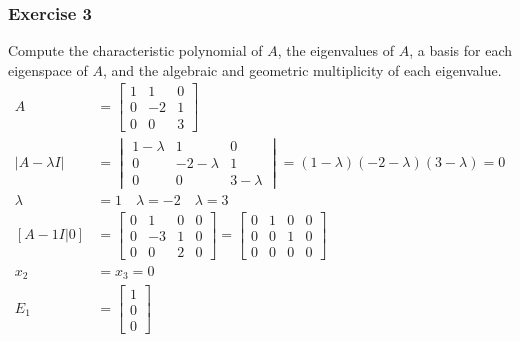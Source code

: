 \documentclass{math}
\begin{document}
\subsubsection*{Exercise 3}
Compute the characteristic polynomial of \( A \), the eigenvalues of \( A \),
a basis for each eigenspace of \( A \), and the algebraic and geometric
multiplicity of each eigenvalue.
\begin{align*}
  A &= \begin{bmatrix}
    1 & 1 & 0 \\
    0 & -2 & 1 \\
    0 & 0 & 3
  \end{bmatrix} \\
  |A-\lambda I| &= \begin{vmatrix}
    1-\lambda & 1 & 0 \\
    0 & -2-\lambda & 1 \\
    0 & 0 & 3-\lambda
  \end{vmatrix} = (1-\lambda)(-2-\lambda)(3-\lambda) = 0 \\
  \lambda &= 1 \quad \lambda = -2 \quad \lambda = 3 \\
  [A-1I|0] &= \begin{bmatrix}
    0 & 1 & 0 & 0 \\
    0 & -3 & 1 & 0 \\
    0 & 0 & 2 & 0
  \end{bmatrix} = \begin{bmatrix}
    0 & 1 & 0 & 0 \\
    0 & 0 & 1 & 0 \\
    0 & 0 & 0 & 0
  \end{bmatrix} \\
  x_2 &= x_3 = 0 \\
  E_1 &= \begin{bmatrix}1 \\ 0 \\ 0\end{bmatrix}
\end{align*}
\end{document}
